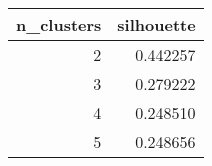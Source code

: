 \begin{tabular}{rr}
\toprule
 n\_clusters &  silhouette \\
\midrule
          2 &    0.442257 \\
          3 &    0.279222 \\
          4 &    0.248510 \\
          5 &    0.248656 \\
\bottomrule
\end{tabular}
